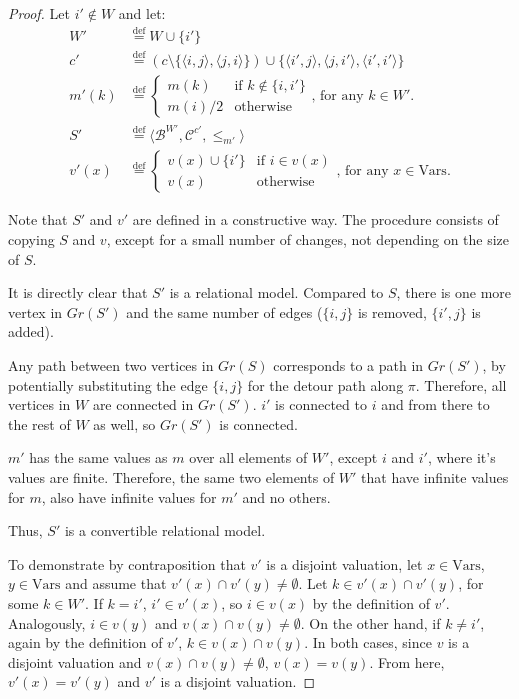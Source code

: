 \documentclass{article}
\newcommand{\B}{\mathcal{B}}
\newcommand{\Vars}{\text{Vars}}
\newcommand{\eqdef}{\stackrel{\text{def}}{=}}
\begin{document}
\begin{proof}
  Let $i' \not \in W$ and let:
\begin{align*}
W' &\eqdef W \cup \{i'\} \\
c' &\eqdef (c \setminus \{\langle i, j \rangle, \langle j, i \rangle\}) \cup \{\langle i', j \rangle, \langle j, i' \rangle, \langle i', i' \rangle\} \\
m'(k) &\eqdef \begin{cases}
m(k)           & \text{if $k \not \in \{i, i'\}$} \\
m(i) / 2       & \text{otherwise}
\end{cases}\text{, for any } k \in W'. \\
S' &\eqdef \langle \B^{W'}, \mathcal{C}^{c'}, \leq_{m'} \rangle \\
v'(x) &\eqdef \begin{cases}
  v(x) \cup \{i'\} & \text{if } i \in v(x) \\
  v(x)             & \text{otherwise}
\end{cases}\text{, for any } x \in \Vars.
\end{align*}

Note that $S'$ and $v'$ are defined in a constructive way. The procedure consists of copying $S$ and $v$, except for a small number of changes, not depending on the size of $S$.

It is directly clear that $S'$ is a relational model. Compared to $S$, there is one more vertex in $Gr(S')$ and the same number of edges ($\{i, j\}$ is removed, $\{i', j\}$ is added).

Any path between two vertices in $Gr(S)$ corresponds to a path in $Gr(S')$, by potentially substituting the edge $\{i, j\}$ for the detour path along $\pi$. Therefore, all vertices in $W$ are connected in $Gr(S')$. $i'$ is connected to $i$ and from there to the rest of $W$ as well, so $Gr(S')$ is connected.

$m'$ has the same values as $m$ over all elements of $W'$, except $i$ and $i'$, where it's values are finite. Therefore, the same two elements of $W'$ that have infinite values for $m$, also have infinite values for $m'$ and no others.

Thus, $S'$ is a convertible relational model.

To demonstrate by contraposition that $v'$ is a disjoint valuation, let $x \in \Vars$, $y \in \Vars$ and assume that $v'(x) \cap v'(y) \neq \emptyset$. Let $k \in v'(x) \cap v'(y)$, for some $k \in W'$. If $k = i'$, $i' \in v'(x)$, so $i \in v(x)$ by the definition of $v'$. Analogously, $i \in v(y)$ and $v(x) \cap v(y) \neq \emptyset$. On the other hand, if $k \neq i'$, again by the definition of $v'$, $k \in v(x) \cap v(y)$. In both cases, since $v$ is a disjoint valuation and $v(x) \cap v(y) \neq \emptyset$, $v(x) = v(y)$. From here, $v'(x) = v'(y)$ and $v'$ is a disjoint valuation.


\end{proof}
\end{document}
